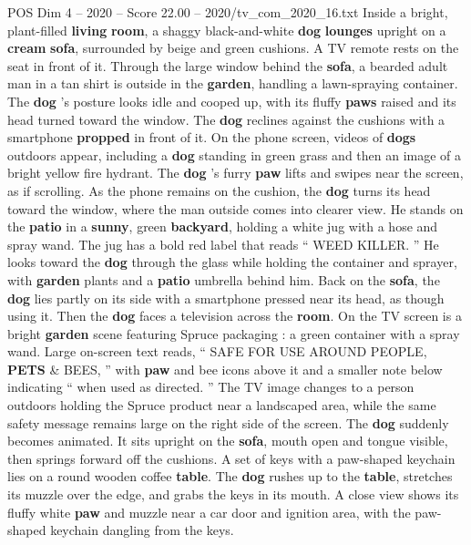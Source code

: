 \begin{textsample}{POS Dim 4 – 2020 – Score 22.00 – 2020/tv\_com\_2020\_16.txt}  \label{ex:f4_pos_003}
Inside a bright, plant-filled \textbf{living} \textbf{room}, a shaggy black-and-white \textbf{dog} \textbf{lounges} upright on a \textbf{cream} \textbf{sofa}, surrounded by beige and green cushions.
A TV remote rests on the seat in front of it.
Through the large window behind the \textbf{sofa}, a bearded adult man in a tan shirt is outside in the \textbf{garden}, handling a lawn-spraying container.
The \textbf{dog} ’s posture looks idle and cooped up, with its fluffy \textbf{paws} raised and its head turned toward the window.
The \textbf{dog} reclines against the cushions with a smartphone \textbf{propped} in front of it.
On the phone screen, videos of \textbf{dogs} outdoors appear, including a \textbf{dog} standing in green grass and then an image of a bright yellow fire hydrant.
The \textbf{dog} ’s furry \textbf{paw} lifts and swipes near the screen, as if scrolling.
As the phone remains on the cushion, the \textbf{dog} turns its head toward the window, where the man outside comes into clearer view.
He stands on the \textbf{patio} in a \textbf{sunny}, green \textbf{backyard}, holding a white jug with a hose and spray wand.
The jug has a bold red label that reads “ WEED KILLER. ” He looks toward the \textbf{dog} through the glass while holding the container and sprayer, with \textbf{garden} plants and a \textbf{patio} umbrella behind him.
Back on the \textbf{sofa}, the \textbf{dog} lies partly on its side with a smartphone pressed near its head, as though using it.
Then the \textbf{dog} faces a television across the \textbf{room}.
On the TV screen is a bright \textbf{garden} scene featuring Spruce packaging : a green container with a spray wand.
Large on-screen text reads, “ SAFE FOR USE AROUND PEOPLE, \textbf{PETS} \& BEES, ” with \textbf{paw} and bee icons above it and a smaller note below indicating “ when used as directed. ” The TV image changes to a person outdoors holding the Spruce product near a landscaped area, while the same safety message remains large on the right side of the screen.
The \textbf{dog} suddenly becomes animated.
It sits upright on the \textbf{sofa}, mouth open and tongue visible, then springs forward off the cushions.
A set of keys with a paw-shaped keychain lies on a round wooden coffee \textbf{table}.
The \textbf{dog} rushes up to the \textbf{table}, stretches its muzzle over the edge, and grabs the keys in its mouth.
A close view shows its fluffy white \textbf{paw} and muzzle near a car door and ignition area, with the paw-shaped keychain dangling from the keys.

\end{textsample}
